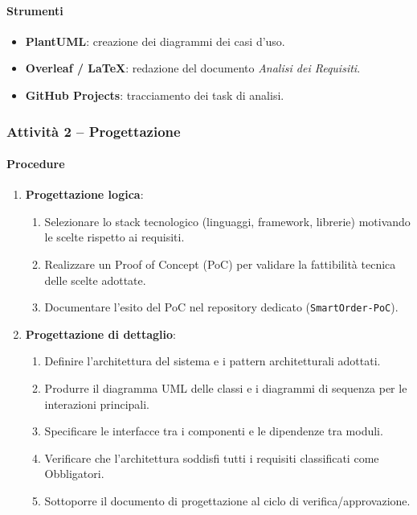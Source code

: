 \documentclass[a4paper, 11pt, oneside]{scrartcl}
\begin{document}
\paragraph{Strumenti}
\begin{itemize}
    \item \textbf{PlantUML}: creazione dei diagrammi dei casi d'uso.
    \item \textbf{Overleaf / \LaTeX{}}: redazione del documento \emph{Analisi dei Requisiti}.
    \item \textbf{GitHub Projects}: tracciamento dei task di analisi.
\end{itemize}

\subsubsection{Attività 2 – Progettazione}

\paragraph{Procedure}
\begin{enumerate}
    \item \textbf{Progettazione logica}:
    \begin{enumerate}[label=\alph*.]
        \item Selezionare lo stack tecnologico (linguaggi, framework{\scriptsize{}}, librerie) motivando le scelte rispetto ai requisiti.
        \item Realizzare un Proof of Concept{\scriptsize{}} (PoC) per validare la fattibilità tecnica delle scelte adottate.
        \item Documentare l'esito del PoC nel repository dedicato (\texttt{SmartOrder-PoC}).
    \end{enumerate}
    \item \textbf{Progettazione di dettaglio}:
    \begin{enumerate}[label=\alph*.]
        \item Definire l'architettura{\scriptsize{}} del sistema e i pattern architetturali{\scriptsize{}} adottati.
        \item Produrre il diagramma UML delle classi e i diagrammi di sequenza per le interazioni principali.
        \item Specificare le interfacce tra i componenti e le dipendenze tra moduli.
        \item Verificare che l'architettura soddisfi tutti i requisiti classificati come Obbligatori.
        \item Sottoporre il documento di progettazione al ciclo di verifica/approvazione.
    \end{enumerate}
\end{enumerate}
\end{document}
